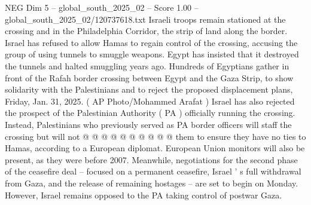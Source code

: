 \begin{textsample}{NEG Dim 5 – global\_south\_2025\_02 – Score 1.00 – global\_south\_2025\_02/120737618.txt}
Israeli troops remain stationed at the crossing and in the Philadelphia Corridor, the strip of land along the border.
Israel has refused to allow Hamas to regain control of the crossing, accusing the group of using tunnels to smuggle weapons.
Egypt has insisted that it destroyed the tunnels and halted smuggling years ago.
Hundreds of Egyptians gather in front of the Rafah border crossing between Egypt and the Gaza Strip, to show solidarity with the Palestinians and to reject the proposed displacement plans, Friday, Jan. 31, 2025. ( AP Photo/Mohammed Arafat ) Israel has also rejected the prospect of the Palestinian Authority ( PA ) officially running the crossing.
Instead, Palestinians who previously served as PA border officers will staff the crossing but will not @ @ @ @ @ @ @ @ @ @ them to ensure they have no ties to Hamas, according to a European diplomat.
European Union monitors will also be present, as they were before 2007.
Meanwhile, negotiations for the second phase of the ceasefire deal -- focused on a permanent ceasefire, Israel ' s full withdrawal from Gaza, and the release of remaining hostages -- are set to begin on Monday.
However, Israel remains opposed to the PA taking control of postwar Gaza.

\end{textsample}

